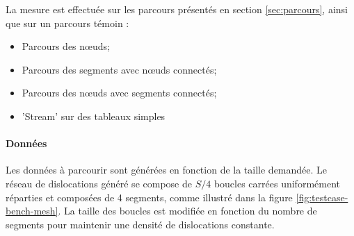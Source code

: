La mesure est effectuée sur les parcours présentés en section \ref{sec:parcours}, ainsi que sur un parcours témoin :
\begin{itemize}
	\item Parcours des nœuds;
	\item Parcours des segments avec nœuds connectés;
	\item Parcours des nœuds avec segments connectés;
	\item 'Stream' sur des tableaux simples
\end{itemize}

\paragraph{Données}

Les données à parcourir sont générées en fonction de la taille demandée. Le réseau de dislocations généré se compose de $S/4$ boucles carrées uniformément réparties et composées de 4 segments, comme illustré dans la figure \ref{fig:testcase-bench-mesh}. La taille des boucles est modifiée en fonction du nombre de segments pour maintenir une densité de dislocations constante.

